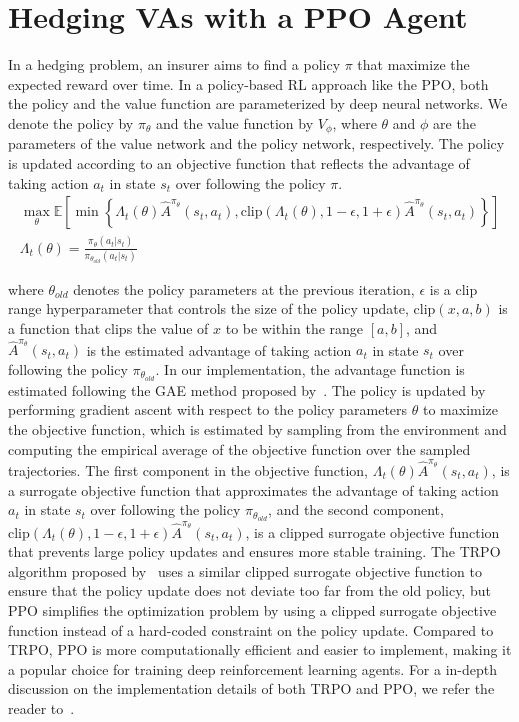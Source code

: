 \section{Hedging VAs with a PPO Agent}
In a hedging problem, an insurer aims to find a policy $\pi$ that maximize the expected reward over time.
In a policy-based RL approach like the PPO, both the policy and the value function are parameterized by deep neural networks.
We denote the policy by $\pi_{\theta}$ and the value function by $V_{\phi}$, where $\theta$ and $\phi$ are the parameters of the value network and the policy network, respectively.
The policy is updated according to an objective function that reflects the advantage of taking action $a_t$ in state $s_t$ over following the policy $\pi$.
\begin{align}
    \max_{\theta} \mathbb{E}\left[ \min \left\{ \Lambda_t(\theta)\hat{A}^{\pi_{\theta}}(s_t, a_t), \text{clip}(\Lambda_t(\theta), 1-\epsilon, 1 + \epsilon) \hat{A}^{\pi_{\theta}}(s_t, a_t)  \right\} \right] \\
    \Lambda_t(\theta) = \frac{\pi_{\theta}(a_t|s_t)}{\pi_{\theta_{old}}(a_t|s_t)} 
\end{align}

where $\theta_{old}$ denotes the policy parameters at the previous iteration, $\epsilon$ is a clip range hyperparameter that controls the size of the policy update, $\text{clip}(x, a, b)$ is a function that clips the value of $x$ to be within the range $[a, b]$, and $\hat{A}^{\pi_{\theta}}(s_t, a_t)$ is the estimated advantage of taking action $a_t$ in state $s_t$ over following the policy $\pi_{\theta_{old}}$.
In our implementation, the advantage function is estimated following the GAE method proposed by~\cite{schulman2015high}.
The policy is updated by performing gradient ascent with respect to the policy parameters $\theta$ to maximize the objective function, which is estimated by sampling from the environment and computing the empirical average of the objective function over the sampled trajectories.
The first component in the objective function, $\Lambda_t(\theta) \hat{A}^{\pi_{\theta}}(s_t, a_t)$, is a surrogate objective function that approximates the advantage of taking action $a_t$ in state $s_t$ over following the policy $\pi_{\theta_{old}}$, and the second component, $\text{clip}(\Lambda_t(\theta), 1-\epsilon, 1 + \epsilon) \hat{A}^{\pi_{\theta}}(s_t, a_t)$, is a clipped surrogate objective function that prevents large policy updates and ensures more stable training.
The TRPO algorithm proposed by~\cite{schulman2015trust} uses a similar clipped surrogate objective function to ensure that the policy update does not deviate too far from the old policy, but PPO simplifies the optimization problem by using a clipped surrogate objective function instead of a hard-coded constraint on the policy update.
Compared to TRPO, PPO is more computationally efficient and easier to implement, making it a popular choice for training deep reinforcement learning agents.
For a in-depth discussion on the implementation details of both TRPO and PPO, we refer the reader to~\cite{engstrom2020implementation}.

